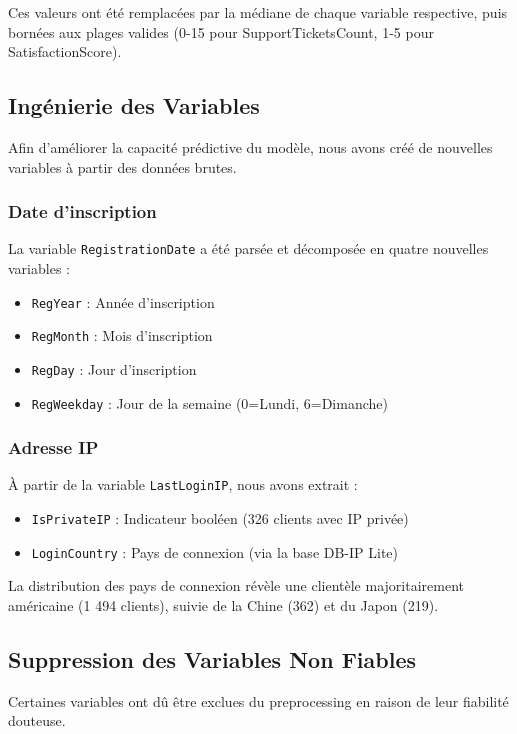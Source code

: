 \documentclass[12pt,a4paper]{article}
\begin{document}
Ces valeurs ont été remplacées par la médiane de chaque variable respective, puis bornées aux plages valides (0-15 pour SupportTicketsCount, 1-5 pour SatisfactionScore).

\subsection{Ingénierie des Variables}

Afin d'améliorer la capacité prédictive du modèle, nous avons créé de nouvelles variables à partir des données brutes.

\subsubsection{Date d'inscription}
La variable \texttt{RegistrationDate} a été parsée et décomposée en quatre nouvelles variables :
\begin{itemize}
    \item \texttt{RegYear} : Année d'inscription
    \item \texttt{RegMonth} : Mois d'inscription
    \item \texttt{RegDay} : Jour d'inscription
    \item \texttt{RegWeekday} : Jour de la semaine (0=Lundi, 6=Dimanche)
\end{itemize}

\subsubsection{Adresse IP}
À partir de la variable \texttt{LastLoginIP}, nous avons extrait :
\begin{itemize}
    \item \texttt{IsPrivateIP} : Indicateur booléen (326 clients avec IP privée)
    \item \texttt{LoginCountry} : Pays de connexion (via la base DB-IP Lite)
\end{itemize}

La distribution des pays de connexion révèle une clientèle majoritairement américaine (1 494 clients), suivie de la Chine (362) et du Japon (219).

\subsection{Suppression des Variables Non Fiables}

Certaines variables ont dû être exclues du preprocessing en raison de leur fiabilité douteuse.
\end{document}
